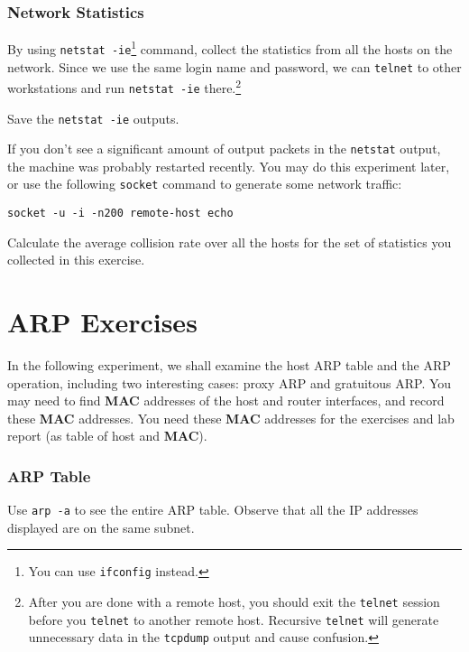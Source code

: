 \documentclass{../UTNetLab}
\begin{document}
\section{Network Statistics}
    By using \lstinline{netstat -ie}\footnote{You can use \lstinline{ifconfig} instead.} command, collect the statistics from all the hosts on the network.
    Since we use the same login name and password, we can \lstinline{telnet} to other workstations and run \lstinline{netstat -ie} there.\footnote{%
    After you are done with a remote host, you should exit the \lstinline{telnet} session before you \lstinline{telnet} to another remote host.
    Recursive \lstinline{telnet} will generate unnecessary data in the \lstinline{tcpdump} output and cause confusion.
    }

    Save the \lstinline{netstat -ie} outputs.

    If you don’t see a significant amount of output packets in the \lstinline{netstat} output, the machine was probably restarted recently. You may do this experiment later, or use the following \lstinline{socket} command to generate some network traffic:
    \begin{lstlisting}[emph={remote-host}]
socket -u -i -n200 remote-host echo
    \end{lstlisting}
    
    \begin{question}
    \item Calculate the average collision rate over all the hosts for the set of statistics you collected in this exercise.
    \end{question}

\part{ARP Exercises}
    In the following experiment, we shall examine the host ARP table and the ARP operation, including two interesting cases: proxy ARP and gratuitous ARP. You may need to find \textbf{MAC} addresses of the host and router interfaces, and record these \textbf{MAC} addresses.
    You need these \textbf{MAC} addresses for the exercises and lab report (as table of host and \textbf{MAC}).

\section{ARP Table}
    Use \lstinline{arp -a} to see the entire ARP table.
    Observe that all the IP addresses displayed are on the same subnet.
\end{document}
